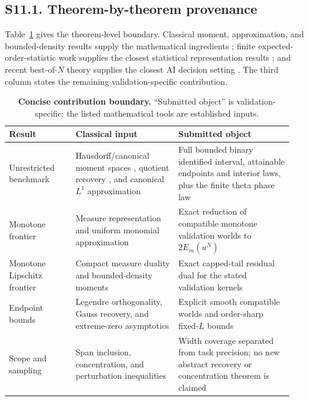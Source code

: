 \subsection*{S11.1. Theorem-by-theorem provenance}

Table~\ref{si:tab:provenance} gives the theorem-level boundary. Classical moment, approximation, and bounded-density results supply the mathematical ingredients \citep{hausdorff1921,dette1997,bojanov1986,newman1976,lasserre2006}; finite expected-order-statistic work supplies the closest statistical representation results \citep{mallows1973,papadatos2017,okolewski2024}; and recent best-of-$N$ theory supplies the closest AI decision setting \citep{huang2025}. The third column states the remaining validation-specific contribution.

\begin{table}[H]
\centering
\caption{\textbf{Concise contribution boundary.} ``Submitted object'' is validation-specific; the listed mathematical tools are established inputs.}
\label{si:tab:provenance}
\begingroup
\footnotesize
\setlength{\tabcolsep}{3pt}
\begin{tabular}{@{}>{\raggedright\arraybackslash}p{0.22\linewidth}>{\raggedright\arraybackslash}p{0.34\linewidth}>{\raggedright\arraybackslash}p{0.38\linewidth}@{}}
\toprule
Result & Classical input & Submitted object \\
\midrule
Unrestricted benchmark & Hausdorff/canonical moment spaces \citep{hausdorff1921,dette1997}, quotient recovery \citep{donoho1994}, and canonical $L^1$ approximation \citep{bojanov1986} & Full bounded binary identified interval, attainable endpoints and interior laws, plus the finite theta phase law \\
Monotone frontier & Measure representation and uniform monomial approximation \citep{newman1976} & Exact reduction of compatible monotone validation worlds to $2E_m(u^N)$ \\
Monotone Lipschitz frontier & Compact measure duality and bounded-density moments \citep{lasserre2006} & Exact capped-tail residual dual for the stated validation kernels \\
Endpoint bounds & Legendre orthogonality, Gauss recovery, and extreme-zero asymptotics & Explicit smooth compatible worlds and order-sharp fixed-$L$ bounds \\
Scope and sampling & Span inclusion, concentration, and perturbation inequalities \citep{ettehad2021} & Width coverage separated from task precision; no new abstract recovery or concentration theorem is claimed \\
\bottomrule
\end{tabular}
\endgroup
\end{table}

